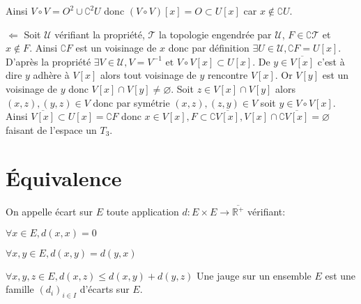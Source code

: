 \documentclass[a4paper, 11pt, french]{book}
\newenvironment{itemise}{\itemize}{\enditemize}
\theoremstyle{plain} %
\theoremstyle{definition} %
\theoremstyle{remark} %
\newcommand{\1}{\mathds{1}}
\newcommand\vide{\varnothing}
\newcommand{\infegal}{\leqslant}
\newcommand{\inv}[1]{#1^{-1}}
\newcommand\et{\text{ et }}
\newcommand{\R}{\mathbb{R}}
\begin{document}
\begin{itemise}
\begin{center}
	\end{center}
	Ainsi $V\circ V=O^2\cup\complement^2 U$ donc $(V\circ V)[x]=O\subset U[x]$ car $x\notin\complement U$.
	\item[$\Leftarrow$] Soit $\mathscr{U}$ vérifiant la propriété, $\mathscr{T}$ la topologie engendrée par $\mathscr{U}$, $F\in\complement\mathscr{T}$ et $x\notin F$.
	Ainsi $\complement F$ est un voisinage de $x$ donc par définition $\exists U\in\mathscr{U}, \complement F=U[x]$.
	D'après la propriété $\exists V\in\mathscr{U}, V=\inv{V}\et V\circ V[x]\subset U[x]$.
	De $y\in\overline{V[x]}$ c'est à dire $y$ adhère à $V[x]$ alors tout voisinage de $y$ rencontre $V[x]$.
	Or $V[y]$ est un voisinage de $y$ donc $V[x]\cap V[y]\neq\vide$.
	Soit $z\in V[x]\cap V[y]$ alors $(x, z), (y, z)\in V$ donc par symétrie $(x, z), (z, y)\in V$ soit $y\in V\circ V[x]$.
	Ainsi $\overline{V[x]}\subset U[x]=\complement F$ donc $x\in V[x], F\subset\complement\overline{V[x]}, V[x]\cap\complement\overline{V[x]}=\vide$ faisant de l'espace un $T_3$.
\end{itemise}

\section{Équivalence}

On appelle écart sur $E$ toute application $d:E\times E\rightarrow\overline{\R^+}$ vérifiant:
\begin{itemise}
	\item $\forall x\in E, d(x, x)=0$
	\item $\forall x, y\in E, d(x, y)=d(y, x)$
	\item $\forall x, y, z\in E, d(x, z)\infegal d(x, y)+d(y, z)$
\end{itemise}
Une jauge sur un ensemble $E$ est une famille $(d_i)_{i\in I}$ d'écarts sur $E$.
\end{document}
